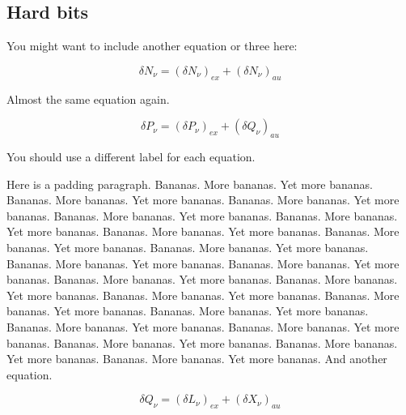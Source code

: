 \documentclass[12pt,a4paper]{report}
\begin{document}
\subsection{Hard bits}
You might want to include another equation or three here:

\begin{equation}
  \delta N_{\nu} = (\delta N_{\nu})_{ex} + (\delta N_{\nu})_{au} 
  \label{equation:delsplit2}
\end{equation}

Almost the same equation again.

\begin{equation}
  \delta P_{\nu} = (\delta P_{\nu})_{ex} + (\delta Q_{\nu})_{au} 
  \label{equation:delsplit3}
\end{equation}

You should use a different label for each equation.

Here is a padding paragraph.  Bananas.  More bananas.  Yet more
bananas.  Bananas.  More bananas.  Yet more bananas.  Bananas.  More
bananas.  Yet more bananas.  Bananas.  More bananas.  Yet more
bananas.  Bananas.  More bananas.  Yet more bananas.  Bananas.  More
bananas.  Yet more bananas.  Bananas.  More bananas.  Yet more
bananas.  Bananas.  More bananas.  Yet more bananas.  Bananas.  More
bananas.  Yet more bananas.  Bananas.  More bananas.  Yet more
bananas.  Bananas.  More bananas.  Yet more bananas.  Bananas.  More
bananas.  Yet more bananas.  Bananas.  More bananas.  Yet more
bananas.  Bananas.  More bananas.  Yet more bananas.  Bananas.  More
bananas.  Yet more bananas.  Bananas.  More bananas.  Yet more
bananas.  Bananas.  More bananas.  Yet more bananas.  Bananas.  More
bananas.  Yet more bananas.  Bananas.  More bananas.  Yet more
bananas.  Bananas.  More bananas.  Yet more bananas. And another
equation.

\begin{equation}
  \delta Q_{\nu} = (\delta L_{\nu})_{ex} + (\delta X_{\nu})_{au} 
  \label{equation:delsplit4}
\end{equation}
\end{document}
